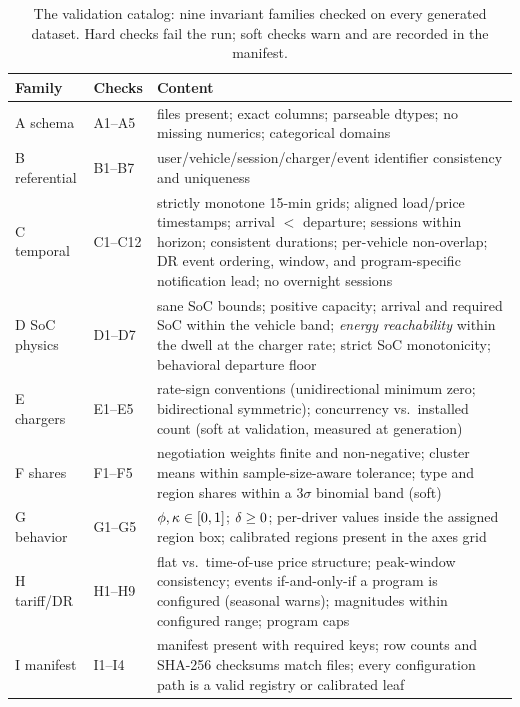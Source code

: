 \begin{table}[h]
\caption{The validation catalog: nine invariant families checked on every
generated dataset. Hard checks fail the run; soft checks warn and are
recorded in the manifest.}
\label{tab:invariants}
\centering\small
\begin{tabular}{@{}llp{4.6cm}@{}}
\toprule
Family & Checks & Content \\
\midrule
A schema & A1--A5 & files present; exact columns; parseable dtypes; no
missing numerics; categorical domains \\
B referential & B1--B7 & user/vehicle/session/charger/event identifier
consistency and uniqueness \\
C temporal & C1--C12 & strictly monotone 15-min grids; aligned load/price
timestamps; arrival $<$ departure; sessions within horizon; consistent
durations; per-vehicle non-overlap; DR event ordering, window, and
program-specific notification lead; no overnight sessions \\
D SoC physics & D1--D7 & sane SoC bounds; positive capacity; arrival and
required SoC within the vehicle band; \emph{energy reachability} within the
dwell at the charger rate; strict SoC monotonicity; behavioral departure
floor \\
E chargers & E1--E5 & rate-sign conventions (unidirectional minimum zero;
bidirectional symmetric); concurrency vs.\ installed count (soft at
validation, measured at generation) \\
F shares & F1--F5 & negotiation weights finite and non-negative; cluster
means within sample-size-aware tolerance; type and region shares within a
$3\sigma$ binomial band (soft) \\
G behavior & G1--G5 & $\phi, \kappa \in [0,1]$; $\delta \ge 0$;
per-driver values inside the assigned region box; calibrated regions present
in the axes grid \\
H tariff/DR & H1--H9 & flat vs.\ time-of-use price structure; peak-window
consistency; events if-and-only-if a program is configured (seasonal warns);
magnitudes within configured range; program caps \\
I manifest & I1--I4 & manifest present with required keys; row counts and
SHA-256 checksums match files; every configuration path is a valid registry
or calibrated leaf \\
\bottomrule
\end{tabular}
\end{table}
